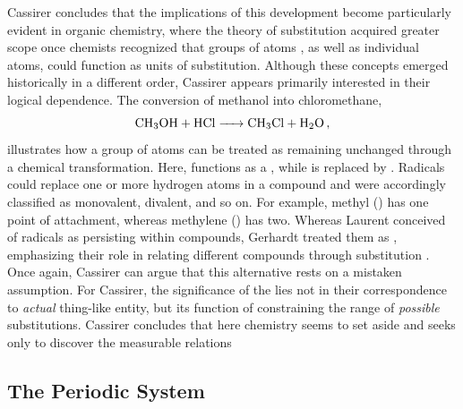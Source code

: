 \documentclass[submitted,12pt]{article}
\begin{document}
Cassirer concludes that the implications of this development become particularly evident in organic chemistry, where the theory of substitution acquired greater scope once chemists recognized that groups of atoms , as well as individual atoms, could function as units of substitution. Although these concepts emerged historically in a different order, Cassirer appears primarily interested in their logical dependence. The conversion of methanol into chloromethane, $$\ce{CH3OH + HCl -> CH3Cl + H2O}\,,$$ illustrates how a group of atoms can be treated as remaining unchanged through a chemical transformation. Here,  functions as a  , while  is replaced by . Radicals could replace one or more hydrogen atoms in a compound and were accordingly classified as monovalent, divalent, and so on. For example, methyl () has one point of attachment, whereas methylene () has two. Whereas Laurent conceived of radicals as  persisting within compounds, Gerhardt treated them as , emphasizing their role in relating different compounds through substitution . Once again, Cassirer can argue that this alternative \citep[175, 189ff.]{Ladenburg1902} rests on a mistaken assumption. For Cassirer, the significance of the   lies not in their correspondence to \emph{actual} thing-like entity, but its function of constraining the range of \emph{possible} substitutions. Cassirer concludes that here chemistry seems to set aside  and seeks only to discover the measurable relations  



\subsection{The Periodic System}
\end{document}
